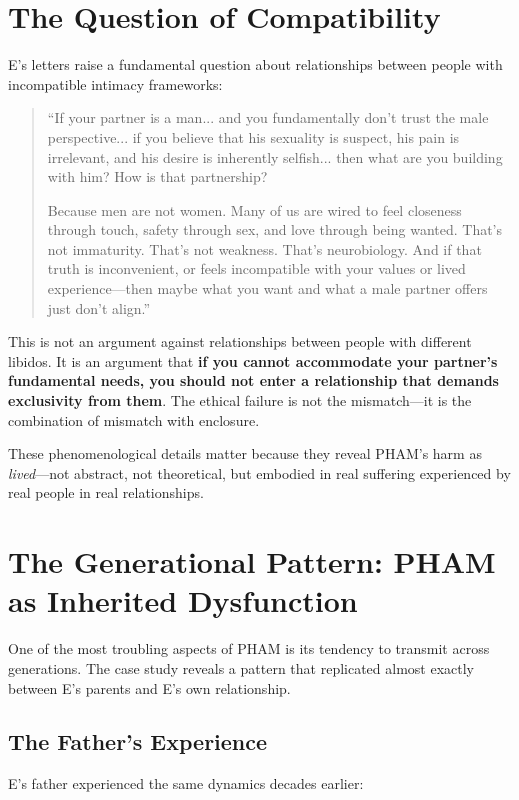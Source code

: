 \documentclass[12pt,openany]{book}
\numberwithin{equation}{chapter}
\begin{document}
\section{The Question of Compatibility}

E's letters raise a fundamental question about relationships between people with incompatible intimacy frameworks:

\begin{quote}
``If your partner is a man... and you fundamentally don't trust the male perspective... if you believe that his sexuality is suspect, his pain is irrelevant, and his desire is inherently selfish... then what are you building with him? How is that partnership?

Because men are not women. Many of us are wired to feel closeness through touch, safety through sex, and love through being wanted. That's not immaturity. That's not weakness. That's neurobiology. And if that truth is inconvenient, or feels incompatible with your values or lived experience---then maybe what you want and what a male partner offers just don't align.''
\end{quote}

This is not an argument against relationships between people with different libidos. It is an argument that \textbf{if you cannot accommodate your partner's fundamental needs, you should not enter a relationship that demands exclusivity from them}. The ethical failure is not the mismatch---it is the combination of mismatch with enclosure.

These phenomenological details matter because they reveal PHAM's harm as \textit{lived}---not abstract, not theoretical, but embodied in real suffering experienced by real people in real relationships.

\section{The Generational Pattern: PHAM as Inherited Dysfunction}

One of the most troubling aspects of PHAM is its tendency to transmit across generations. The case study reveals a pattern that replicated almost exactly between E's parents and E's own relationship.

\subsection{The Father's Experience}

E's father experienced the same dynamics decades earlier:
\end{document}
